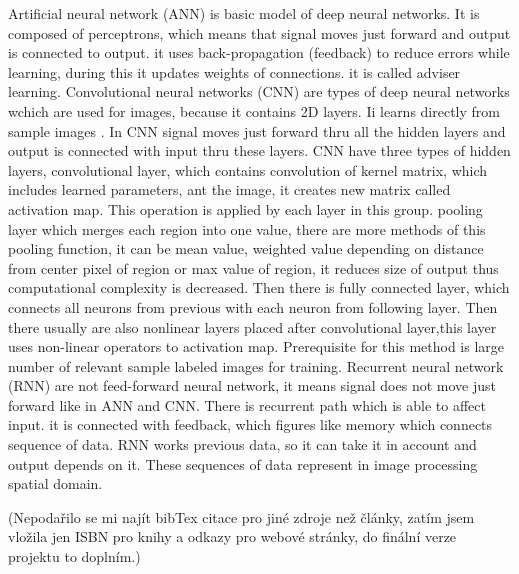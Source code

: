         Artificial neural network (ANN) is basic model of deep neural networks. It is composed of perceptrons, which means that signal moves just forward and output is connected to output.
        it uses back-propagation (feedback) to reduce errors while learning, during this it updates weights of connections. it is called adviser learning. \cite{30}
        Convolutional neural networks (CNN) are types of deep neural networks wchich are used for images, because it contains 2D layers. Ii learns directly from sample images \cite{2}.
        In CNN signal moves just forward thru all the hidden layers and output is connected with input thru these layers.
        CNN have three types of hidden layers, convolutional layer, which contains convolution of kernel matrix, which includes learned parameters, ant the image, it creates new matrix
        called activation map. This operation is applied by each layer in this group. pooling layer which merges each region into one value, there are more methods of this pooling function,
        it can be mean value, weighted value depending on distance from center pixel of region or max value of region, it reduces size of output thus computational complexity is decreased.
        Then there is fully connected layer, which connects all neurons from previous with each neuron from following layer. Then there usually are also nonlinear layers placed
        after convolutional layer,this layer uses non-linear operators to activation map. Prerequisite for this method is large number of relevant sample labeled images for training. \cite{30, 31}
        Recurrent neural network (RNN) are not feed-forward neural network, it means signal does not move just forward like in ANN and CNN. There is recurrent path which is able to affect input.
        it is connected with feedback, which figures like memory which connects sequence of data. RNN works previous data, so it can take it in account and output depends on it.
        These sequences of data represent in image processing spatial domain. \cite{30}

    \clearpage	
    \renewcommand{\refname}{Reference} 	%
    (Nepodařilo se mi najít bibTex citace pro jiné zdroje než články, zatím jsem vložila jen ISBN pro knihy
    a odkazy pro webové stránky, do finální verze projektu to doplním.)
    \printbibliography
    \clearpage

